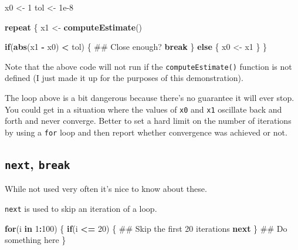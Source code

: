 \documentclass[]{book}
\newenvironment{Shaded}{\begin{snugshade}}{\end{snugshade}}
\newcommand{\KeywordTok}[1]{\textcolor[rgb]{0.13,0.29,0.53}{\textbf{#1}}}
\newcommand{\DecValTok}[1]{\textcolor[rgb]{0.00,0.00,0.81}{#1}}
\newcommand{\FloatTok}[1]{\textcolor[rgb]{0.00,0.00,0.81}{#1}}
\newcommand{\StringTok}[1]{\textcolor[rgb]{0.31,0.60,0.02}{#1}}
\newcommand{\ControlFlowTok}[1]{\textcolor[rgb]{0.13,0.29,0.53}{\textbf{#1}}}
\newcommand{\OperatorTok}[1]{\textcolor[rgb]{0.81,0.36,0.00}{\textbf{#1}}}
\newcommand{\NormalTok}[1]{#1}
\theoremstyle{definition}
\theoremstyle{definition}
\theoremstyle{definition}
\theoremstyle{remark}
\begin{document}
\begin{Shaded}
\begin{Highlighting}[]
\NormalTok{x0 <-}\StringTok{ }\DecValTok{1}
\NormalTok{tol <-}\StringTok{ }\FloatTok{1e-8}

\ControlFlowTok{repeat}\NormalTok{ \{}
\NormalTok{        x1 <-}\StringTok{ }\KeywordTok{computeEstimate}\NormalTok{()}
        
        \ControlFlowTok{if}\NormalTok{(}\KeywordTok{abs}\NormalTok{(x1 }\OperatorTok{-}\StringTok{ }\NormalTok{x0) }\OperatorTok{<}\StringTok{ }\NormalTok{tol) \{  ## Close enough?}
                \ControlFlowTok{break}
\NormalTok{        \} }\ControlFlowTok{else}\NormalTok{ \{}
\NormalTok{                x0 <-}\StringTok{ }\NormalTok{x1}
\NormalTok{        \} }
\NormalTok{\}}
\end{Highlighting}
\end{Shaded}

Note that the above code will not run if the \texttt{computeEstimate()}
function is not defined (I just made it up for the purposes of this
demonstration).

The loop above is a bit dangerous because there's no guarantee it will
ever stop. You could get in a situation where the values of \texttt{x0}
and \texttt{x1} oscillate back and forth and never converge. Better to
set a hard limit on the number of iterations by using a \texttt{for}
loop and then report whether convergence was achieved or not.

\subsection{\texorpdfstring{\texttt{next},
\texttt{break}}{next, break}}\label{next-break}

While not used very often it's nice to know about these.

\texttt{next} is used to skip an iteration of a loop.

\begin{Shaded}
\begin{Highlighting}[]
\ControlFlowTok{for}\NormalTok{(i }\ControlFlowTok{in} \DecValTok{1}\OperatorTok{:}\DecValTok{100}\NormalTok{) \{}
        \ControlFlowTok{if}\NormalTok{(i }\OperatorTok{<=}\StringTok{ }\DecValTok{20}\NormalTok{) \{}
\NormalTok{                ## Skip the first 20 iterations}
                \ControlFlowTok{next}                 
\NormalTok{        \}}
\NormalTok{        ## Do something here}
\NormalTok{\}}
\end{Highlighting}
\end{Shaded}
\end{document}
